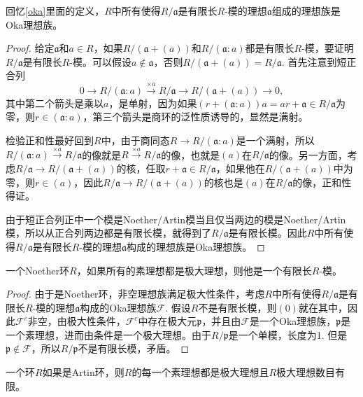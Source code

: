 \begin{lem}
回忆\ref{oka}里面的定义，$R$中所有使得$R/\mathfrak{a}$是有限长$R$-模的理想$\mathfrak{a}$组成的理想族是Oka理想族。
\end{lem}

\begin{proof} 
	给定$\mathfrak{a}$和$a\in R$，如果$R/(\mathfrak{a}+(a))$和$R/(\mathfrak{a}:a)$都是有限长$R$-模，要证明$R/\mathfrak{a}$是有限长$R$-模。可以假设$a\not\in \mathfrak{a}$，否则$R/(\mathfrak{a}+(a))=R/\mathfrak{a}$. 首先注意到短正合列
	\[
		0\to R/(\mathfrak{a}:a)\xrightarrow{\times a} R/\mathfrak{a} \to R/(\mathfrak{a}+(a))\to 0,
	\]
	其中第二个箭头是乘以$a$，是单射，因为如果$(r+(\mathfrak{a}:a))a=ar+\mathfrak{a}\in R/\mathfrak{a}$为零，则$r\in (\mathfrak{a}:a)$，第三个箭头是商环的泛性质诱导的，显然是满射。

	检验正和性最好回到$R$中，由于商同态$R\to R/(\mathfrak{a}:a)$是一个满射，所以$R/(\mathfrak{a}:a)\xrightarrow{\times a} R/\mathfrak{a}$的像就是$R\xrightarrow{\times a} R/\mathfrak{a}$的像，也就是$(a)$在$R/\mathfrak{a}$的像。另一方面，考虑$R/\mathfrak{a} \to R/(\mathfrak{a}+(a))$的核，任取$r+\mathfrak{a}\in R/\mathfrak{a}$，如果他在$R/(\mathfrak{a}+(a))$中为零，则$r\in (a)$，因此$R/\mathfrak{a} \to R/(\mathfrak{a}+(a))$的核也是$(a)$在$R/\mathfrak{a}$的像，正和性得证。

	由于短正合列正中一个模是Noether/Artin模当且仅当两边的模是Noether/Artin模，所以从正合列两边都是有限长模，就得到了$R/\mathfrak{a}$是有限长模。因此$R$中所有使得$R/\mathfrak{a}$是有限长$R$-模的理想$\mathfrak{a}$构成的理想族是Oka理想族。
\end{proof}

\begin{pro}
一个Noether环$R$，如果所有的素理想都是极大理想，则他是一个有限长$R$-模。
\end{pro}

\begin{proof}
	由于是Noether环，非空理想族满足极大性条件，考虑$R$中所有使得$R/\mathfrak{a}$是有限长$R$-模的理想$\mathfrak{a}$构成的Oka理想族$\mathcal{F}$. 假设$R$不是有限长模，则$(0)$就在其中，因此$\mathcal{F}^c$非空，由极大性条件，$\mathcal{F}^c$中存在极大元$\mathfrak{p}$，并且由$\mathcal{F}$是一个Oka理想族，$\mathfrak{p}$是一个素理想，进而由条件是一个极大理想。由于$R/\mathfrak{p}$是一个单模，长度为1. 但是$\mathfrak{p}\not\in \mathcal{F}$，所以$R/\mathfrak{p}$不是有限长模，矛盾。
\end{proof}

\begin{pro}
一个环$R$如果是Artin环，则$R$的每一个素理想都是极大理想且$R$极大理想数目有限。

\end{pro}

